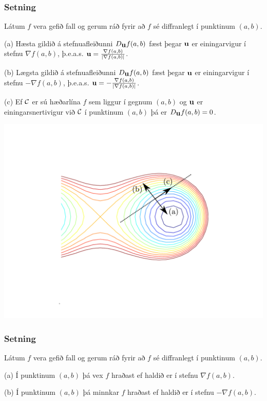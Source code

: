 \subsubsection{Setning }
 Látum $f$ vera gefið fall og gerum ráð fyrir að
$f$ sé diffranlegt í punktinum $(a,b)$.

\medskip
(a)  Hæsta gildið á stefnuafleiðunni $D_{\mbox{${\bf u}$}}f(a,b)$ fæst þegar $\mbox{${\bf u}$}$
er einingarvigur í stefnu $\nabla f(a,b)$, þ.e.a.s. $\mbox{${\bf u}$}=\frac{\nabla f(a,b)}{|\nabla f(a,b)|}$.  

\medskip
(b)  Lægsta gildið á stefnuafleiðunni $D_{\mbox{${\bf u}$}}f(a,b)$ fæst þegar $\mbox{${\bf u}$}$
er einingarvigur í stefnu $-\nabla f(a,b)$, þ.e.a.s. $\mbox{${\bf u}$}=-\frac{\nabla f(a,b)}{|\nabla f(a,b)|}$. 

\medskip
(c)  Ef $\cal C$ er sú hæðarlína $f$ sem liggur í gegnum $(a,b)$ og
$\mbox{${\bf u}$}$ er einingarsnertivigur við $\cal C$ í punktinum $(a,b)$ þá er
$D_{\mbox{${\bf u}$}}f(a,b)=0$.  




   \centering
            \includegraphics[width=1\linewidth]{contours.pdf}
	\caption*{ }
 

\subsubsection{Setning }
Látum $f$ vera gefið fall og gerum ráð fyrir að
$f$ sé diffranlegt í punktinum $(a,b)$.  

\medskip
(a) Í punktinum $(a,b)$ þá vex $f$ hraðast ef haldið er í stefnu
$\nabla f(a,b)$.  

\medskip
(b) Í punktinum $(a,b)$ þá minnkar $f$ hraðast ef haldið er í stefnu
$-\nabla f(a,b)$.  

